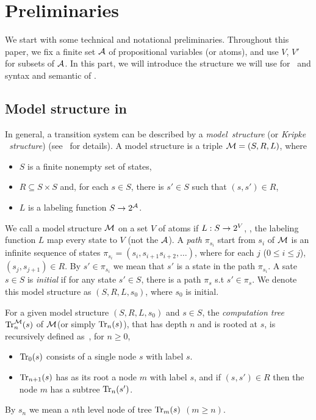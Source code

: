 \documentclass{article}
\begin{document}
 \section{Preliminaries}
 We start with some technical and notational preliminaries. Throughout this paper, we fix a finite set ${\cal A}$ of propositional variables (or atoms), and use $V$, $V'$ for subsets of ${\cal A}$. In this part, we will introduce the structure we will use for \CTL\ and syntax and semantic of \CTL.
\subsection{Model structure in \CTL}
In general, a transition system
 can be described by a \emph{model\ structure} (or \emph{Kripke \ structure}) (see~\cite{Baier:PMC:2008} for details). A model structure is a triple ${\cal M}=(S,R,L)$, where
\begin{itemize}
  \item $S$ is a finite nonempty set of states,
  \item $R\subseteq S\times S$ and, for each $s\in S$, there
  is $s'\in S$ such that $(s,s')\in R$,
  \item $L$ is a labeling function $S\rightarrow 2^{\cal A}$.
\end{itemize}
We call a model structure ${\cal M}$ on a set $V$ of atoms if $L: S \rightarrow 2^V$, \ie, the labeling function $L$ map every state to $V$ (not the ${\cal A}$).  A \emph{path} $\pi_{s_i}$ start from $s_i$ of ${\cal M}$ is an infinite sequence of states $\pi_{s_i}=(s_i, s_{i+1} s_{i+2},\dots)$, where for each $j$ ($0\leq i\leq j$), $(s_j, s_{j+1}) \in R$. By $s'\in \pi_{s_i}$ we mean that $s'$ is a state in the path $\pi_{s_i}$.
A sate $s\in S$ is {\em initial} if for any state $s'\in S$, there is a path $\pi_s$ s.t $s'\in \pi_s$.
We denote this model structure as $(S,R,L,s_0)$, where $s_0$ is initial.

For a given model structure $(S,R,L,s_0)$ and $s\in S$,
the {\em computation tree}
$\textrm{Tr}_n^{\cal M}(s)$ of $\cal M$(or simply $\textrm{Tr}_n(s)$), that has depth $n$ and is rooted at $s$, is recursively defined as~\cite{DBLP:journals/tcs/BrowneCG88}, for $n\ge 0$,
\begin{itemize}
  \item $\textrm{Tr}_0(s)$ consists of a single node $s$ with label $s$.
  \item $\textrm{Tr}_{n+1}(s)$ has as its root a node $m$ with label  $s$, and
  if $(s,s')\in R$ then the node $m$ has a subtree $\textrm{Tr}_n(s')$.
\end{itemize}
By $s_n$ we mean a $n$th level node of tree $\textrm{Tr}_m(s)$ $(m \geq n)$.
\end{document}

